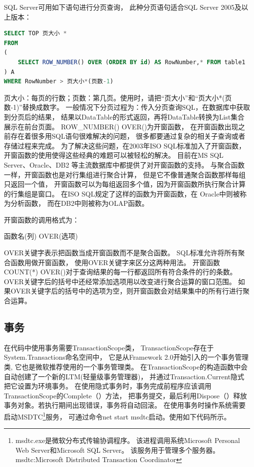 \documentclass{book}
\begin{document}
SQL Server可用如下语句进行分页查询，
此种分页语句适合SQL Server 2005及以上版本：

\begin{lstlisting}[language=SQL]
SELECT TOP 页大小 * 
FROM 
(
	SELECT ROW_NUMBER() OVER (ORDER BY id) AS RowNumber,* FROM table1
) A
WHERE RowNumber > 页大小*(页数-1)
\end{lstlisting}

页大小：每页的行数；页数：第几页。使用时，请把“页大小”和“页大小*(页数-1)”替换成数字。
一般情况下分页过程为：传入分页查询SQL，在数据库中获取到分页后的结果，
结果以DataTable的形式返回，再将DataTable转换为List集合展示在前台页面。
ROW\_NUMBER() OVER()为开窗函数，
在开窗函数出现之前存在着很多用SQL语句很难解决的问题，
很多都要通过复杂的相关子查询或者存储过程来完成。
为了解决这些问题，在2003年ISO SQL标准加入了开窗函数，
开窗函数的使用使得这些经典的难题可以被轻松的解决。
目前在MS SQL Server、Oracle、DB2 等主流数据库中都提供了对开窗函数的支持。
与聚合函数一样，开窗函数也是对行集组进行聚合计算，
但是它不像普通聚合函数那样每组只返回一个值，
开窗函数可以为每组返回多个值，因为开窗函数所执行聚合计算的行集组是窗口。
在ISO SQL规定了这样的函数为开窗函数，在 Oracle中则被称为分析函数，
而在DB2中则被称为OLAP函数。

开窗函数的调用格式为：

函数名(列) OVER(选项) 

OVER关键字表示把函数当成开窗函数而不是聚合函数。
SQL标准允许将所有聚合函数用做开窗函数，
使用OVER关键字来区分这两种用法。
开窗函数COUNT(*) OVER()对于查询结果的每一行都返回所有符合条件的行的条数。
OVER关键字后的括号中还经常添加选项用以改变进行聚合运算的窗口范围。
如果OVER关键字后的括号中的选项为空，则开窗函数会对结果集中的所有行进行聚合运算。    

\subsection{事务}

在代码中使用事务需要TransactionScope类，
TransactionScope存在于System.Transactions命名空间中，
它是从Framework 2.0开始引入的一个事务管理类,
它也是微软推荐使用的一个事务管理类。
在TransactionScope的构造函数中会自动创建了一个新的LTM(轻量级事务管理器)，
并通过Transaction.Current隐式把它设置为环境事务。
在使用隐式事务时，事务完成前程序应该调用TransactionScope的Complete（）方法，
把事务提交，最后利用Dispose（）释放事务对象。若执行期间出现错误，事务将自动回滚。
在使用事务时操作系统需要启动MSDTC\footnote{msdtc.exe是微软分布式传输协调程序。
该进程调用系统Microsoft Personal Web Server和Microsoft SQL Server。
该服务用于管理多个服务器。msdtc:Microsoft Distributed Transaction Coordinator}服务，
可通过命令net start msdtc启动。使用如下代码所示。
\end{document}

